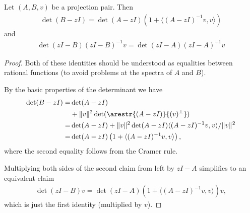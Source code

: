 \begin{lem}\label{projection_characteristic_polynomial}
	Let $(A, B, v)$ be a projection pair. Then
	\begin{align*}
		\det(B - z I) = \det(A - z I) \left(1 + \langle (A - z I)^{-1}v, v\rangle\right)
	\end{align*}
	and
	\begin{align*}
		\det(z I - B) (z I - B)^{-1} v = \det(z I - A) (z I - A)^{-1} v
	\end{align*}
\end{lem}
\begin{proof}
	Both of these identities should be understood as equalities between rational functions (to avoid problems at the spectra of $A$ and $B$).

	By the basic properties of the determinant we have
	\begin{align*}
		\det(B - z I) =& \det(A - z I) \\
		&+ \|v\|^2 \det(\arestr{(A - z I)}{(v)^{\perp}}) \\
		=& \det(A - z I) + \|v\|^2 \det(A - z I) \langle (A - zI)^{-1} v, v \rangle/\|v\|^2 \\
		=&  \det(A - z I) \left(1 + \langle (A - z I)^{-1}v, v\rangle\right),
	\end{align*}
	where the second equality follows from the Cramer rule.

	Multiplying both sides of the second claim from left by $z I - A$ simplifies to an equivalent claim
	\begin{align*}
	\det(z I - B) v = \det(z I - A) (1 + \langle (A - z I)^{-1} v, v \rangle) v,
	\end{align*}
	which is just the first identity (multiplied by $v$).
\end{proof}


